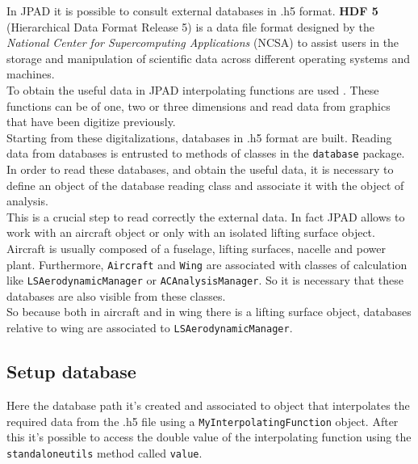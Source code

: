 In JPAD it is possible to consult external databases in .h5 format. {\bfseries HDF 5} (Hierarchical Data Format Release 5) is a data file format designed by the {\itshape National Center for Supercomputing Applications} (NCSA) to assist users in the storage and manipulation of scientific data across different operating systems and machines.\\
To obtain the useful data in JPAD  interpolating functions are used . These functions can be of one, two or three dimensions and read data from graphics that have been digitize previously.\\
Starting from these digitalizations, databases in .h5 format are built.
Reading data from databases is entrusted to methods of classes in the \texttt{database} package.\\
In order to read these databases, and obtain the useful data, it is necessary to define an object of the database reading class and associate it with the object of analysis.\\
This is a crucial step to read correctly the external data. In fact JPAD allows to work with an aircraft object  or only with an isolated lifting surface object.  Aircraft is usually composed of a fuselage, lifting surfaces, nacelle and power plant.
Furthermore, \texttt{Aircraft} and \texttt{Wing} are associated with classes of calculation like \texttt{LSAerodynamicManager} or \texttt{ACAnalysisManager}. So it is necessary that these databases are also visible from these classes.\\
So because  both in aircraft and in wing there is a lifting surface object, databases relative to wing are associated to \texttt{LSAerodynamicManager}.

\subsection {Setup database}
Here the database path it's created and associated to object that interpolates the required data from the .h5 file using a \texttt{MyInterpolatingFunction} object. After this it's possible to access the double value of the interpolating function using the \texttt{standaloneutils} method called \texttt{value}. \\


%

